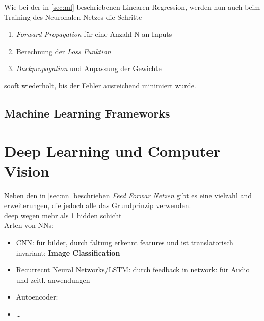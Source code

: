 Wie bei der in \ref{sec:ml} beschriebenen Linearen Regression, werden nun auch beim Training des Neuronalen 
Netzes die Schritte
\begin{enumerate}
    \item \textit{Forward Propagation} für eine Anzahl N an Inputs
    \item Berechnung der \textit{Loss Funktion}
    \item \textit{Backpropagation} und Anpassung der Gewichte
\end{enumerate}
sooft wiederholt, bis der Fehler ausreichend minimiert wurde.





\subsection{Machine Learning Frameworks}


\section{Deep Learning und Computer Vision}\label{sec:deepl_cv}


Neben den in \ref{sec:nn} beschrieben \textit{Feed Forwar Netzen} gibt es eine vielzahl and erweiterungen, die jedoch alle das 
Grundprinzip verwenden.\\

deep wegen mehr als 1 hidden schicht\\

Arten von NNs:
\begin{itemize}
    \item CNN: für bilder, durch faltung erkennt features und ist translatorisch invariant: \textbf{Image Classification}
    \item Recurrecnt Neural Networks/LSTM: durch feedback in network: für Audio und zeitl. anwendungen 
    \item Autoencoder: 
    \item \dots
\end{itemize}

